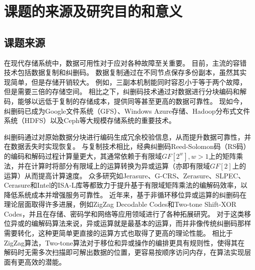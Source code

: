 

\chapter{课题的来源及研究目的和意义}

\section{课题来源}

在现代存储系统中，数据可用性对于应对各种故障至关重要\cite{fordAvailabilityGloballyDistributed2010}。
目前，主流的容错技术包括数据复制和纠删码。
数据复制通过在不同节点保存多份副本，虽然其实现简单，但是存储开销较大。
例如，三副本机制能同时容忍小于等于两个故障，但是需要三倍的存储空间。
相比之下，纠删码技术通过对数据进行分块编码和解码，能够以远低于复制的存储成本，提供同等甚至更高的数据可靠性\cite{weatherspoonErasureCodingVs2002}。
现如今，纠删码已成为Google文件系统（GFS）\cite{ghemawatGoogleFileSystem2003}、Windows Azure存储\cite{calderWindowsAzureStorage2011, huangErasureCodingWindows2012}、Hadoop分布式文件系统（HDFS）\cite{shvachkoHadoopDistributedFile2010, chiniahDynamicErasureCoding2019}以及Ceph\cite{weilCephScalableHighPerformance2006, weilCephReliableScalable2007}等大规模存储系统的重要技术。

纠删码通过对原始数据分块进行编码生成冗余校验信息，从而提升数据可靠性，并在数据丢失时实现恢复。
与复制技术相比，经典纠删码Reed-Solomon码（RS码）\cite{reedPolynomialCodesCertain1960}的编码和解码过程计算量更大\cite{weatherspoonErasureCodingVs2002}，其通常依赖于有限域$GF[2^w], w>1$上的矩阵乘法，并在计算时将部分有限域上的运算转换为异或运算（亦即有限域$GF[2]$上的运算）\cite{lubyXORBasedErasureResilientCoding1995}从而提高计算速度。
众多研究如Jerasure\cite{plankJerasureLibraryFacilitating2008, arslanOpenMPPOSIXThreads2017}、G-CRS\cite{liuGCRSGPUAccelerated2018}、Zerasure\cite{zhouFastErasureCoding2019, zhouFastErasureCoding2020}、SLPEC\cite{uezatoAcceleratingXORbasedErasure2021}、Cerasure\cite{niuCerasureFastAcceleration2023, wangFastAccelerationStrategies2025}和Intel的ISA-L库\cite{gajalwarExploringDataProtection2024}等都致力于提升基于有限域矩阵乘法的编解码效率，以降低系统成本并增强服务可靠性。
近年来，基于非循环移位异或运算的纠删码在理论层面取得许多进展，例如ZigZag Decodable Codes\cite{sungZigZagDecodableCodeMDS2013, daiNewZigzagDecodableCode2017, gongZigzagDecodableCodes2017}和Two-tone Shift-XOR Codes\cite{fuOverheadfreeInplaceRecovery2014, fuOverheadfreeInplaceRecovery2015, fuDecodingRepairSchemes2020, chengSuccessivelySolvableShiftAdd2021, fuTwotoneShiftXORStorage2021}，并且在存储\cite{gongZigzagDecodableCodes2017, daiBandwidthOverheadFreeData2017}、密码学\cite{gongZigzagDecodableRampSecret2018, kabiriradEfficientRampSecret2023, chenNewShiftAddSecret2024}和网络\cite{daiZigzagDivisionMultipleAccess2019}等应用领域进行了各种拓展研究。
对于这类移位异或的编解码算法来说，异或运算就是最基本的运算，而并非像传统纠删码那样需要转化，这种更简单更直接的运算方式也取得了更高的理论性能\cite{gongZigzagDecodableCodes2017}。
相比于ZigZag算法，Two-tone算法对于移位和异或操作的编排更具有规则性，使得其在解码时无需多次扫描即可解出数据的位置，更容易按顺序访问内存，在算法实现层面有更高效的潜能\cite{chengSuccessivelySolvableShiftAdd2021, fuTwotoneShiftXORStorage2021}。

